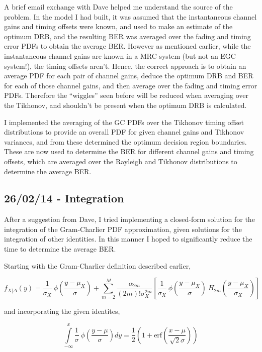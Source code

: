 A brief email exchange with Dave helped me understand the source of the
problem. In the model I had built, it was assumed that the instantaneous
channel gains and timing offsets were known, and used to make an
estimate of the optimum DRB, and the resulting BER was averaged over the
fading and timing error PDFs to obtain the average BER. However as
mentioned earlier, while the instantaneous channel gains are known in a
MRC system (but not an EGC system!), the timing offsets aren't. Hence,
the correct approach is to obtain an average PDF for each pair of
channel gains, deduce the optimum DRB and BER for each of those channel
gains, and then average over the fading and timing error PDFs. Therefore
the ``wiggles'' seen before will be reduced when averaging over the
Tikhonov, and shouldn't be present when the optimum DRB is calculated.

I implemented the averaging of the GC PDFs over the Tikhonov timing
offset distributions to provide an overall PDF for given channel gains
and Tikhonov variances, and from these determined the optimum decision
region boundaries. These are now used to determine the BER for different
channel gains and timing offsets, which are averaged over the Rayleigh
and Tikhonov distributions to determine the average BER.

\subsection{26/02/14 - Integration}

After a suggestion from Dave, I tried implementing a closed-form
solution for the integration of the Gram-Charlier PDF approximation,
given solutions for the integration of other identities. In this manner
I hoped to significantly reduce the time to determine the average BER.

Starting with the Gram-Charlier definition described earlier,

\[
f_{X\vert \Delta}(y) = \frac{1}{\sigma_X} \: \phi \! \left ( \frac{y-\mu_X}{\sigma} \right ) + \sum \limits_{m=2}^M \frac{\alpha_{2m}}{(2m)! \sigma_X^{2m}} \left [ \frac{1}{\sigma_X} \: \phi \! \left ( \frac{y-\mu_X}{\sigma} \right ) \: H_{2m} \! \left ( \frac{y-\mu_X}{\sigma_X} \right ) \right ]
\]

and incorporating the given identites,

\[
\int \limits_{-\infty}^x \frac{1}{\sigma} \: \phi \! \left ( \frac{y-\mu}{\sigma} \right ) dy =
\frac{1}{2} \left ( 1 + \text{erf} \! \left ( \frac{x-\mu}{\sqrt{2} \sigma} \right ) \right )
\]

